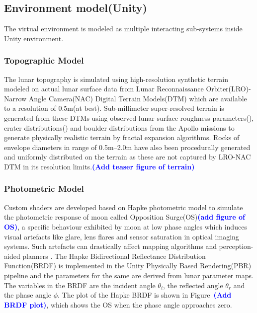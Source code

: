 \documentclass[a4paper, 10pt, conference]{ieeeconf}      %
\newcommand\coltxt[2]{\textbf{\textcolor{#1}{(#2)}}}
\newcommand\msm[1]{\coltxt{blue}{#1}}
\begin{document}
\subsection{Environment model(Unity)}
The virtual environment is modeled as multiple interacting sub-systems inside Unity environment.
\subsubsection{Topographic Model}
The lunar topography is simulated using high-resolution synthetic terrain modeled on actual lunar surface data from Lunar Reconnaissance Orbiter(LRO)-Narrow Angle Camera(NAC) Digital Terrain Models(DTM) which are available to a resolution of 0.5m(at best). Sub-millimeter super-resolved terrain is generated from these DTMs using observed lunar surface roughness parameters(\cite{manned1971analysis,rowan1971lunar}), crater distributions(\cite{neukum1975study,heiken1991lunar}) and boulder distributions \cite{watkins2018boulder} from the Apollo missions to generate physically realistic terrain by fractal expansion algorithms. Rocks of envelope diameters in range of 0.5m--2.0m have also been procedurally generated and uniformly distributed on the terrain as these are not captured by LRO-NAC DTM in its resolution limits.\msm{Add teaser figure of terrain}
\subsubsection{Photometric Model}
Custom shaders are developed based on Hapke photometric model\cite{hapke2012theory} to simulate the photometric response of moon called Opposition Surge(OS)\cite{gehrels1964wavelength}\msm{add figure of OS}, a specific behaviour exhibited by moon at low phase angles which induces visual artefacts like glare, lens flares and sensor saturation in optical imaging systems. Such artefacts can drastically affect mapping algorithms and perception-aided planners \cite{otsu2017look}. The Hapke Bidirectional Reflectance Distribution Function(BRDF) is implemented in the Unity Physically Based Rendering(PBR) pipeline\cite{pranckevivcius2014physically} and the parameters for the same are derived from lunar parameter maps\cite{sato2014resolved}. The variables in the BRDF are the incident angle $\theta_i$, the reflected angle $\theta_r$ and the phase angle $\phi$. The plot of the Hapke BRDF is shown in Figure~\msm{Add BRDF plot}, which shows the OS when the phase angle approaches zero.
\end{document}
